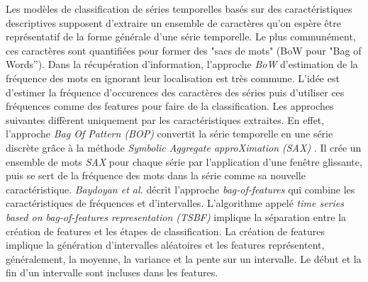 Les mod\`eles de classification de s\'eries temporelles bas\'es sur des caract\'eristiques
descriptives  supposent  d'extraire  un  ensemble  de  caract\`eres qu'on  esp\`ere  \^etre
repr\'esentatif de la forme g\'en\'erale d'une s\'erie temporelle. Le plus commun\'ement,
ces caract\`eres sont quantifi\'ees pour former des "sacs de mots" (BoW pour "Bag of Words'').
Dans la r\'ecup\'eration d'information, l'approche {\em BoW} d'estimation de la fr\'equence des mots en ignorant leur localisation est tr\`es commune. L'id\'ee est d'estimer la fr\'equence d'occurences des caract\`eres des s\'eries puis  d'utiliser ces fr\'equences comme des features pour faire de la  classification.
\newline
Les approches suivantes diff\`erent uniquement par les caract\'eristiques extraites.
En effet, l'approche {\em Bag Of Pattern (BOP)} \cite{lin2012rotation} convertit la s\'erie temporelle en une s\'erie discr\`ete gr\^ace \`a la m\'ethode {\em Symbolic Aggregate approXimation (SAX)} \cite{lin2007experiencing}. Il cr\'ee un ensemble de mots {\em SAX} pour chaque s\'erie par l'application d'une fen\^etre glissante, puis se sert de la fr\'equence des mots dans la s\'erie comme sa nouvelle caract\'eristique. 
{\em Baydoyan et al.} \cite{baydogan2013bag} d\'ecrit l'approche {\em bag-of-features} qui combine les caract\'eristiques de fr\'equences et d'intervalles. L'algorithme appel\'e {\em time series based on bag-of-features representation (TSBF)} implique la s\'eparation entre la cr\'eation de features et les \'etapes de classification. 
La cr\'eation de features implique la g\'en\'eration d'intervalles al\'eatoires et les features repr\'esentent, g\'en\'eralement, la moyenne, la variance et la pente sur un intervalle. 
Le d\'ebut et la fin d'un intervalle sont incluses dans les features. 